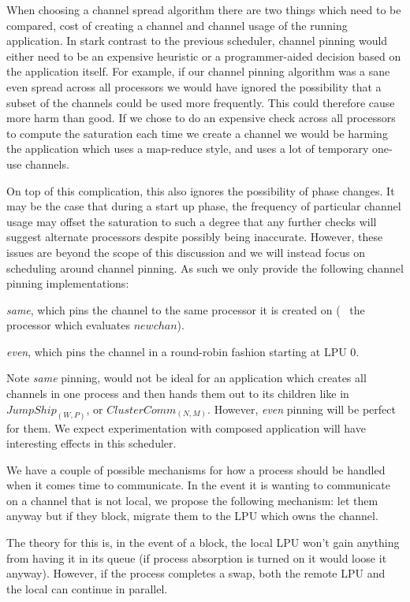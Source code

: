 When choosing a channel spread algorithm there are two things which need to be
compared, cost of creating a channel and channel usage of the running application. 
In stark contrast to the previous scheduler, channel
pinning would either need to be an expensive heuristic or a programmer-aided
decision based on the application itself.
For example, if our channel pinning algorithm was a sane even spread across all
processors we would have ignored the possibility that a subset of the channels
could be used more frequently. This could therefore cause more harm than good.
If we chose to do an expensive check across all processors to compute the 
saturation each time we create a channel we would be harming the application 
which uses a map-reduce style, and uses a lot of temporary one-use channels.

On top of this complication, this also ignores the possibility of phase changes.
It may be the case that during a start up phase, the frequency of particular 
channel usage may offset the saturation to such a degree that any further 
checks will suggest alternate processors despite possibly being inaccurate.
However, these issues are beyond the scope of this discussion and we will 
instead focus on scheduling around channel pinning. As such we only provide the
following channel pinning implementations: 
\begin{inparaenum}
\item \emph{same}, which pins the channel to the same processor it is created 
    on (\ie~ the processor which evaluates $newchan$).
\item \emph{even}, which pins the channel in a round-robin fashion starting at
    LPU $0$.
\end{inparaenum}

Note \emph{same} pinning, would not be ideal for an application which creates
all channels in one process and then hands them out to its children like in
$JumpShip_{(W,P)}$, or $ClusterComm_{(N,M)}$. However, \emph{even} pinning will
be perfect for them. We expect experimentation with composed application will
have interesting effects in this scheduler.

We have a couple of possible mechanisms for how a process should be handled when
it comes time to communicate. In the event it is wanting to communicate on a 
channel that is not local, we propose the following mechanism: let them anyway
but if they block, migrate them to the LPU which owns the channel.

The theory for this is, in the event of a block, the local LPU won't gain 
anything from having it in its queue (if process absorption is turned on it would 
loose it anyway). However, if the process completes a swap, both the remote
LPU and the local can continue in parallel.

